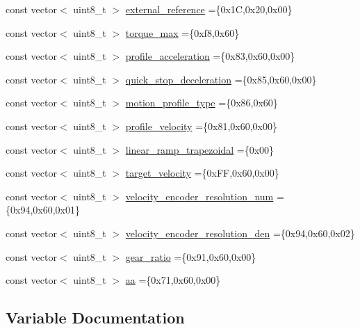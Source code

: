 \begin{DoxyCompactItemize}
\item 
const vector$<$ uint8\+\_\+t $>$ \hyperlink{namespaceod_a647046f6eab50732e8d67e7898a0731a}{external\+\_\+reference} =\{0x1\+C,0x20,0x00\}
\item 
const vector$<$ uint8\+\_\+t $>$ \hyperlink{namespaceod_afe81091f209f3c5eaf8f720e730900fa}{torque\+\_\+max} =\{0xf8,0x60\}
\item 
const vector$<$ uint8\+\_\+t $>$ \hyperlink{namespaceod_aced8c17d62c0e774949057de0a99f402}{profile\+\_\+acceleration} =\{0x83,0x60,0x00\}
\item 
const vector$<$ uint8\+\_\+t $>$ \hyperlink{namespaceod_a57361a1a6b60fd8b93c2828fd7f5429f}{quick\+\_\+stop\+\_\+deceleration} =\{0x85,0x60,0x00\}
\item 
const vector$<$ uint8\+\_\+t $>$ \hyperlink{namespaceod_a5256e8439c66da9ab7ad06fa5f72ec1a}{motion\+\_\+profile\+\_\+type} =\{0x86,0x60\}
\item 
const vector$<$ uint8\+\_\+t $>$ \hyperlink{namespaceod_a47b7c8f6797cc134be5ee1d78d83ee50}{profile\+\_\+velocity} =\{0x81,0x60,0x00\}
\item 
const vector$<$ uint8\+\_\+t $>$ \hyperlink{namespaceod_a8d1e6a3e8180e5d64d68588ee182721c}{linear\+\_\+ramp\+\_\+trapezoidal} =\{0x00\}
\item 
const vector$<$ uint8\+\_\+t $>$ \hyperlink{namespaceod_a758ce0003cc482e5464959ed79c808e2}{target\+\_\+velocity} =\{0x\+F\+F,0x60,0x00\}
\item 
const vector$<$ uint8\+\_\+t $>$ \hyperlink{namespaceod_ace9cc22d0ccd7e2ac1b14fb14151ed73}{velocity\+\_\+encoder\+\_\+resolution\+\_\+num} =\{0x94,0x60,0x01\}
\item 
const vector$<$ uint8\+\_\+t $>$ \hyperlink{namespaceod_a2b157384b9a0fb00e80e99438f24f5de}{velocity\+\_\+encoder\+\_\+resolution\+\_\+den} =\{0x94,0x60,0x02\}
\item 
const vector$<$ uint8\+\_\+t $>$ \hyperlink{namespaceod_af615192e30bab04a02f1aa4c21a48642}{gear\+\_\+ratio} =\{0x91,0x60,0x00\}
\item 
const vector$<$ uint8\+\_\+t $>$ \hyperlink{namespaceod_a58009f80110aa4aff7a7ccd58037c27b}{aa} =\{0x71,0x60,0x00\}
\end{DoxyCompactItemize}


\subsection{Variable Documentation}
\mbox{\label{namespaceod_a58009f80110aa4aff7a7ccd58037c27b}} 
